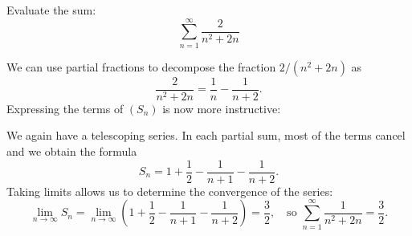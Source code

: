 \documentclass{ximera}
\begin{document}
\begin{example}
Evaluate the sum:
\[
\sum_{n=1}^\infty \frac{2}{n^2+2n}
\]
\begin{explanation}
We can use partial fractions to decompose the fraction $2/(n^2+2n)$ as
  \[
  \frac2{n^2+2n} = \frac1n-\frac1{n+2}.
  \]  
  Expressing the terms of $(S_n)$ is now more instructive:
  \begin{image}
  \end{image}
  We again have a telescoping series. In each partial sum, most of the
  terms cancel and we obtain the formula
  \[
  S_n =1+\frac12-\frac1{n+1}-\frac1{n+2}.
  \]
  Taking limits allows us to determine the convergence of the series:
  \[
  \lim_{n\to\infty}S_n = \lim_{n\to\infty} \left(1+\frac12-\frac1{n+1}-\frac1{n+2}\right) = \frac32,\quad \text{so } \sum_{n=1}^\infty \frac1{n^2+2n} = \frac32.
  \]
\end{explanation}
\end{example}
\end{document}
